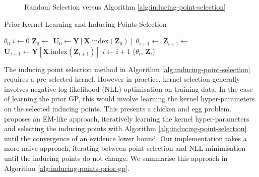 \documentclass{article}
\numberwithin{equation}{section}
\begin{document}
\begin{figure}[h!]
\begin{minipage}{.25\textwidth}
\end{minipage}%
\caption{Random Selection versus Algorithm \ref{alg:inducing-point-selection}}\label{fig:inducing-point-algo}
\end{figure}

\begin{algorithm}[h!]
\caption{Prior Kernel Learning and Inducing Points Selection}\label{alg:inducing-points-prior-gp}
\begin{algorithmic}
\Require $\theta_0$ 
 \State $i \leftarrow 0$
  \State $\mathbf{Z}_0 \leftarrow$  
  \State $\mathbf{U}_0 \leftarrow \mathbf{Y}\left[\mathbf{X}.\text{index}\left(\mathbf{Z}_0\right)\right]$ 
\State $\theta_{i+1} \leftarrow$  
\State $\mathbf{Z}_{i+1} \leftarrow$ 
\State $\mathbf{U}_{i+1} \leftarrow \mathbf{Y}\left[\mathbf{X}.\text{index}\left(\mathbf{Z}_{i+1}\right)\right]$
\State $i \leftarrow i+1$
\EndWhile
\State \Return ($\theta_i$, $\mathbf{Z}_i$)
\end{algorithmic}
\end{algorithm}


The inducing point selection method in Algorithm \ref{alg:inducing-point-selection} requires a pre-selected kernel.
However in practice, kernel selection generally involves negative log-likelihood (NLL) optimisation on training data.
In the case of learning the prior GP, this would involve learning the kernel hyper-parameters on the selected inducing points.
This presents a chicken and egg problem.
\cite{burt2020convergence} proposes an EM-like approach, iteratively learning the kernel hyper-parameters and selecting the inducing points with Algorithm \ref{alg:inducing-point-selection} until the convergence of an evidence lower bound.
Our implementation takes a more naive approach, iterating between point selection and NLL minimisation until the inducing points do not change. 
We summarise this approach in Algorithm \ref{alg:inducing-points-prior-gp}.
\end{document}
